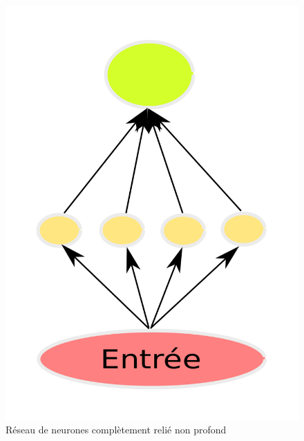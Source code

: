 \documentclass[a4paper, 11pt, onecolumn]{article}
\begin{document}
\begin{figure}[!tbp]
\begin{minipage}[b]{0.3\textwidth}
    \includegraphics[width=\textwidth]{Shallow}
    \caption{Réseau de neurones complètement relié non profond}
  \end{minipage}
  \hfill
  \begin{minipage}[b]{0.3\textwidth}

\end{minipage}
\end{figure}
\end{document}
